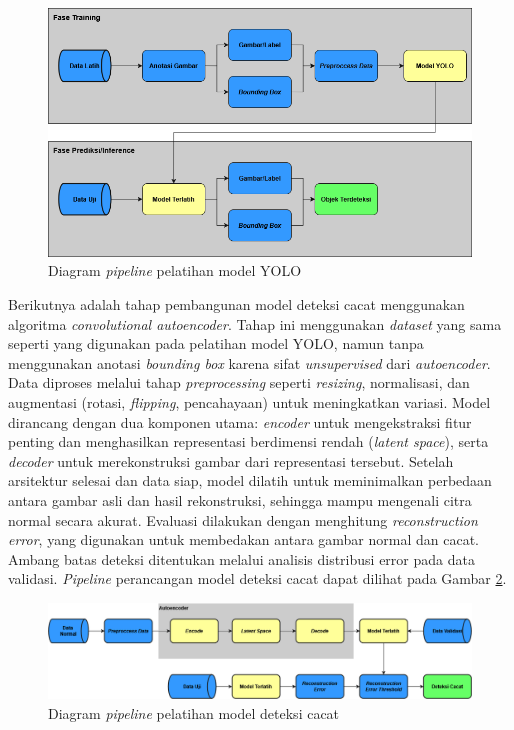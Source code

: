\begin{figure}[H]
  \centering
  \includegraphics[width=\textwidth]{gambar/pipeline_yolo.png}
  \caption{Diagram \textit{pipeline} pelatihan model YOLO}
  \label{fig:pipeline-yolo}
\end{figure}
\vspace{-1em}

Berikutnya adalah tahap pembangunan model deteksi cacat menggunakan
algoritma \textit{convolutional autoencoder}. Tahap ini menggunakan
\textit{dataset}
yang sama seperti yang digunakan pada pelatihan model YOLO, namun
tanpa menggunakan anotasi \textit{bounding box} karena sifat
\textit{unsupervised} dari
\textit{autoencoder}. Data diproses melalui tahap \textit{preprocessing} seperti
\textit{resizing}, normalisasi, dan augmentasi (rotasi,
\textit{flipping}, pencahayaan)
untuk meningkatkan variasi. Model dirancang dengan dua komponen
utama: \textit{encoder} untuk mengekstraksi fitur penting dan menghasilkan
representasi berdimensi rendah (\textit{latent space}), serta
\textit{decoder} untuk
merekonstruksi gambar dari representasi tersebut. Setelah arsitektur
selesai dan data siap, model dilatih untuk meminimalkan perbedaan
antara gambar asli dan hasil rekonstruksi, sehingga mampu mengenali
citra normal secara akurat. Evaluasi dilakukan dengan menghitung
\textit{reconstruction error}, yang digunakan untuk membedakan antara gambar
normal dan cacat. Ambang batas deteksi ditentukan melalui analisis
distribusi error pada data validasi. \textit{Pipeline} perancangan model
deteksi cacat dapat dilihat pada Gambar \ref{fig:pipeline-autoencoder}.

\begin{figure}[H]
  \centering
  \includegraphics[width=\textwidth]{gambar/pipeline_autoencoder.png}
  \caption{Diagram \textit{pipeline} pelatihan model deteksi cacat}
  \label{fig:pipeline-autoencoder}
\end{figure}
\vspace{-1em}

